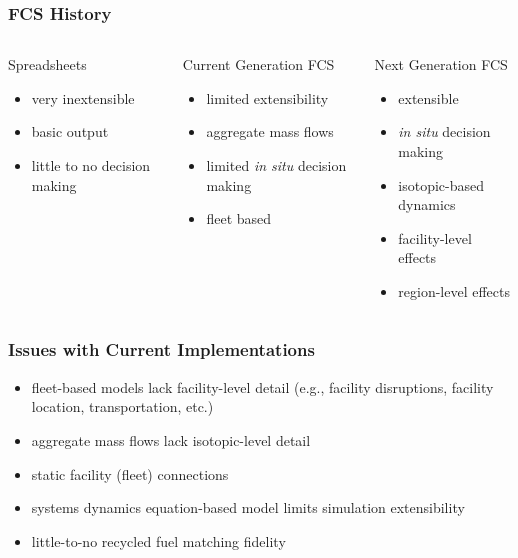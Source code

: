 
\begin{frame}[ctb!]
  \frametitle{FCS History}

  \begin{columns}[t]

    \begin{block}{Spreadsheets}
      \begin{itemize}
        \item very inextensible
        \item basic output
        \item little to no decision making
      \end{itemize}
    \end{block}

    \pause

    \begin{block}{Current Generation FCS}
      \begin{itemize}
        \item limited extensibility
        \item aggregate mass flows
        \item limited \textit{in situ} decision making
        \item fleet based
      \end{itemize}
    \end{block}

    \pause

    \begin{block}{Next Generation FCS}
      \begin{itemize}
        \item extensible
        \item \textit{in situ} decision making
        \item isotopic-based dynamics
        \item facility-level effects
        \item region-level effects
      \end{itemize}
    \end{block}

  \end{columns}
  
\end{frame}

\begin{frame}[ctb!]
  \frametitle{Issues with Current Implementations}
  
  \begin{itemize}
    \item fleet-based models lack facility-level detail (e.g., facility
      disruptions, facility location, transportation, etc.)
    \item aggregate mass flows lack isotopic-level detail
    \item static facility (fleet) connections
    \item systems dynamics equation-based model limits simulation extensibility
    \item little-to-no recycled fuel matching fidelity
  \end{itemize}

\end{frame}

